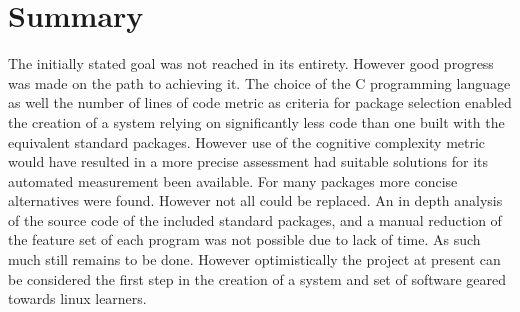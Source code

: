 \section{Summary}\label{Summary}

The initially stated goal was not reached in its entirety. However good progress was made on the path to achieving it. The choice of the C programming language as well the number of lines of code metric as criteria for package selection enabled the creation of a system relying on significantly less code than one built with the equivalent standard packages. However use of the cognitive complexity metric would have resulted in a more precise assessment had suitable solutions for its automated measurement been available. For many packages more concise alternatives were found. However not all could be replaced. An in depth analysis of the source code of the included standard packages, and a manual reduction of the feature set of each program was not possible due to lack of time. As such much still remains to be done. However optimistically the project at present can be considered the first step in the creation of a system and set of software geared towards linux learners.
